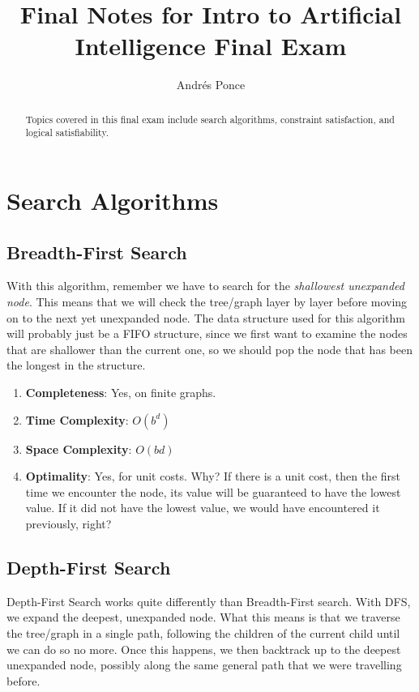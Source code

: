 \documentclass{tufte-handout}
\title{Final Notes for Intro to Artificial Intelligence Final Exam}
\author{Andr\'es Ponce}
\begin{document}
\maketitle
\begin{abstract}
Topics covered in this final exam include search algorithms, constraint satisfaction, 
and logical satisfiability.
\end{abstract}

\section{Search Algorithms}
\subsection{Breadth-First Search}
With this algorithm, remember we have to search for the \textit{shallowest unexpanded node}.
This means that we will check the tree/graph layer by layer before moving on to the next 
	yet unexpanded node.
The data structure used for this algorithm will probably just be a FIFO structure, since we 
	first want to examine the nodes that are shallower than the current one, so we should pop
	the node that has been the longest in the structure.

\begin{enumerate}
	\item \textbf{Completeness}: Yes, on finite graphs. 
	\item \textbf{Time Complexity}: $O(b^{d})$
	\item \textbf{Space Complexity}: $O(bd)$
	\item \textbf{Optimality}: Yes, for unit costs. Why? If there is a unit cost, then the first time
			we encounter the node, its value will be guaranteed to have the lowest value. If it did not
			have the lowest value, we would have encountered it previously, right?
\end{enumerate}
\subsection{Depth-First Search}
Depth-First Search works quite differently than Breadth-First search. With DFS, we expand the deepest,
	unexpanded node. 
What this means is that we traverse the tree/graph in a single path, following the children of the current
	child until we can do so no more.
Once this happens, we then backtrack up to the deepest unexpanded node, possibly along the same general
	path that we were travelling before.
\end{document}
